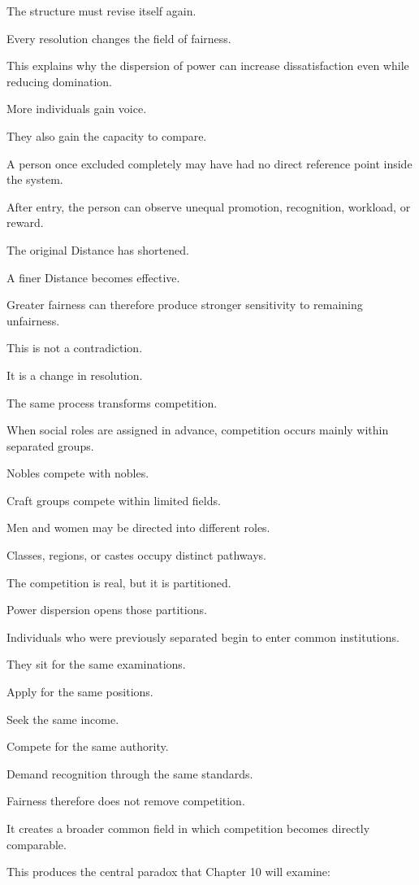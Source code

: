 The structure must revise itself again.

Every resolution changes the field of fairness.

This explains why the dispersion of power can increase dissatisfaction even while reducing domination.

More individuals gain voice.

They also gain the capacity to compare.

A person once excluded completely may have had no direct reference point inside the system.

After entry, the person can observe unequal promotion, recognition, workload, or reward.

The original Distance has shortened.

A finer Distance becomes effective.

Greater fairness can therefore produce stronger sensitivity to remaining unfairness.

This is not a contradiction.

It is a change in resolution.

The same process transforms competition.

When social roles are assigned in advance, competition occurs mainly within separated groups.

Nobles compete with nobles.

Craft groups compete within limited fields.

Men and women may be directed into different roles.

Classes, regions, or castes occupy distinct pathways.

The competition is real, but it is partitioned.

Power dispersion opens those partitions.

Individuals who were previously separated begin to enter common institutions.

They sit for the same examinations.

Apply for the same positions.

Seek the same income.

Compete for the same authority.

Demand recognition through the same standards.

Fairness therefore does not remove competition.

It creates a broader common field in which competition becomes directly comparable.

This produces the central paradox that Chapter 10 will examine:

